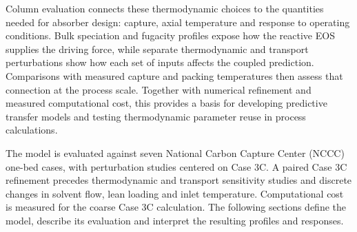 Column evaluation connects these thermodynamic choices to the quantities needed for absorber design: capture, axial temperature and response to operating conditions.
Bulk speciation and fugacity profiles expose how the reactive EOS supplies the driving force, while separate thermodynamic and transport perturbations show how each set of inputs affects the coupled prediction.
Comparisons with measured capture and packing temperatures then assess that connection at the process scale.
Together with numerical refinement and measured computational cost, this provides a basis for developing predictive transfer models and testing thermodynamic parameter reuse in process calculations.

The model is evaluated against seven National Carbon Capture Center (NCCC) one-bed cases, with perturbation studies centered on Case 3C.
A paired Case 3C refinement precedes thermodynamic and transport sensitivity studies and discrete changes in solvent flow, lean loading and inlet temperature.
Computational cost is measured for the coarse Case 3C calculation.
The following sections define the model, describe its evaluation and interpret the resulting profiles and responses.
